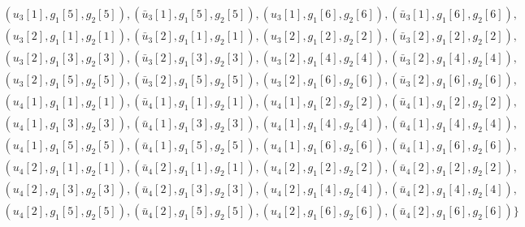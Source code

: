 \documentclass{article}
\begin{document}
\begin{equation*}
\begin{split}
  ( u_3[1], g_1[5], g_2[5] ), (\bar{u}_3[1], g_1[5], g_2[5] ), ( u_3[1], g_1[6], g_2[6] ), ( \bar{u}_3[1], g_1[6], g_2[6] ),\\
  ( u_3[2], g_1[1], g_2[1] ), (\bar{u}_3[2], g_1[1], g_2[1] ), ( u_3[2], g_1[2], g_2[2] ), ( \bar{u}_3[2], g_1[2], g_2[2] ),\\
  ( u_3[2], g_1[3], g_2[3] ), (\bar{u}_3[2], g_1[3], g_2[3] ), ( u_3[2], g_1[4], g_2[4] ), ( \bar{u}_3[2], g_1[4], g_2[4] ),\\
  ( u_3[2], g_1[5], g_2[5] ), (\bar{u}_3[2], g_1[5], g_2[5] ), ( u_3[2], g_1[6], g_2[6] ), ( \bar{u}_3[2], g_1[6], g_2[6] ),\\
  ( u_4[1], g_1[1], g_2[1] ), (\bar{u}_4[1], g_1[1], g_2[1] ), ( u_4[1], g_1[2], g_2[2] ), ( \bar{u}_4[1], g_1[2], g_2[2] ),\\
  ( u_4[1], g_1[3], g_2[3] ), (\bar{u}_4[1], g_1[3], g_2[3] ), ( u_4[1], g_1[4], g_2[4] ), ( \bar{u}_4[1], g_1[4], g_2[4] ),\\
  ( u_4[1], g_1[5], g_2[5] ), (\bar{u}_4[1], g_1[5], g_2[5] ), ( u_4[1], g_1[6], g_2[6] ), ( \bar{u}_4[1], g_1[6], g_2[6] ),\\
  ( u_4[2], g_1[1], g_2[1] ), (\bar{u}_4[2], g_1[1], g_2[1] ), ( u_4[2], g_1[2], g_2[2] ), ( \bar{u}_4[2], g_1[2], g_2[2] ),\\
  ( u_4[2], g_1[3], g_2[3] ), (\bar{u}_4[2], g_1[3], g_2[3] ), ( u_4[2], g_1[4], g_2[4] ), ( \bar{u}_4[2], g_1[4], g_2[4] ),\\
  ( u_4[2], g_1[5], g_2[5] ), (\bar{u}_4[2], g_1[5], g_2[5] ), ( u_4[2], g_1[6], g_2[6] ), ( \bar{u}_4[2], g_1[6], g_2[6] ) \}
\end{split}
\end{equation*}
\end{document}
